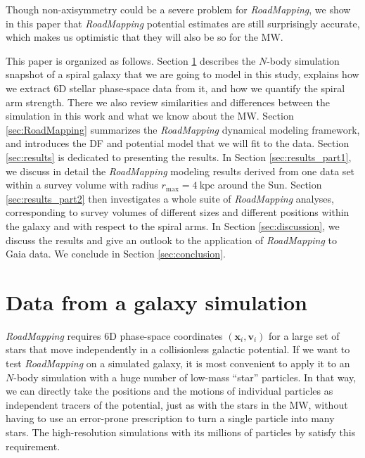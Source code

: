 \documentclass[iop,revtex4,numberedappendix,appendixfloats]{emulateapj}
\newcommand{\vect}[1]{\boldsymbol{#1}}
\newcommand{\RM}{{\sl RoadMapping}}
\begin{document}
Though non-axisymmetry could be a severe problem for \RM{}, we show in this paper that \RM{} potential estimates are still surprisingly accurate, which makes us optimistic that they will also be so for the MW. 

This paper is organized as follows. Section \ref{sec:simulation} describes the $N$-body simulation snapshot of a spiral galaxy that we are going to model in this study, explains how we extract 6D stellar phase-space data from it, and how we quantify the spiral arm strength. There we also review similarities and differences between the simulation in this work and what we know about the MW. Section \ref{sec:RoadMapping} summarizes the \RM{} dynamical modeling framework, and introduces the DF and potential model that we will fit to the data. Section \ref{sec:results} is dedicated to presenting the results. In Section \ref{sec:results_part1}, we discuss in detail the \RM{} modeling results derived from one data set within a survey volume with radius $r_\text{max}=4~\text{kpc}$ around the Sun. Section \ref{sec:results_part2} then investigates a whole suite of \RM{} analyses, corresponding to survey volumes of different sizes and different positions within the galaxy and with respect to the spiral arms. In Section \ref{sec:discussion}, we discuss the results and give an outlook to the application of \RM{} to Gaia data. We conclude in Section \ref{sec:conclusion}.

\section{Data from a galaxy simulation} \label{sec:simulation}

\RM{} requires 6D phase-space coordinates $(\vect{x}_i,\vect{v}_i)$ for a large set of stars that move independently in a collisionless galactic potential. If we want to test \RM{} on a simulated galaxy, it is most convenient to apply it to an $N$-body simulation with a huge number of low-mass ``star'' particles. In that way, we can directly take the positions and the motions of individual particles as independent tracers of the potential, just as with the stars in the MW, without having to use an error-prone prescription to turn a single particle into many stars. The high-resolution simulations with its millions of particles by \citet{2013ApJ...766...34D} satisfy this requirement.
\end{document}
